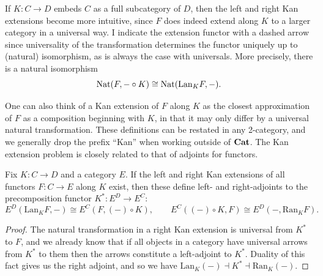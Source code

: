 If $K : C \to D$ embeds $C$ as a full subcategory of $D$, then the left and right Kan extensions become more intuitive, since $F$ does indeed extend along $K$ to a larger category in a universal way. I indicate the extension functor with a dashed arrow since universality of the transformation determines the functor uniquely up to (natural) isomorphism, as is always the case with universals. More precisely, there is a natural isomorphism
\[
	\operatorname{Nat}(F,-\circ K)\cong\operatorname{Nat}(\mathrm{Lan}_KF,-)
.\]

One can also think of a Kan extension of $F$ along $K$ as the closest approximation of $F$ as a composition beginning with $K$, in that it may only differ by a universal natural transformation. These definitions can be restated in any 2-category, and we generally drop the prefix ``Kan'' when working outside of $\mathbf{Cat} $. The Kan extension problem is closely related to that of adjoints for functors.

\begin{proposition}\label{prp:10.2}
	Fix $K : C \to D$ and a category $E$. If the left and right Kan extensions of all functors $F : C \to E$ along $K$ exist, then these define left- and right-adjoints to the precomposition functor $K^* : E^D \to E^C$:
	\[
		E^D(\mathrm{Lan} _KF,-)\cong E^C(F,(-)\circ K),\qquad E^C((-)\circ K,F)\cong E^D(-,\mathrm{Ran} _KF)
	.\]
\end{proposition}
\begin{proof}
	The natural transformation in a right Kan extension is universal from $K^*$ to $F$, and we already know that if all objects in a category have universal arrows from $K^*$ to them then the arrows constitute a left-adjoint to $K^*$. Duality of this fact gives us the right adjoint, and so we have $\mathrm{Lan} _K(-)\dashv K^* \dashv \mathrm{Ran} _K(-)$.
\end{proof}

